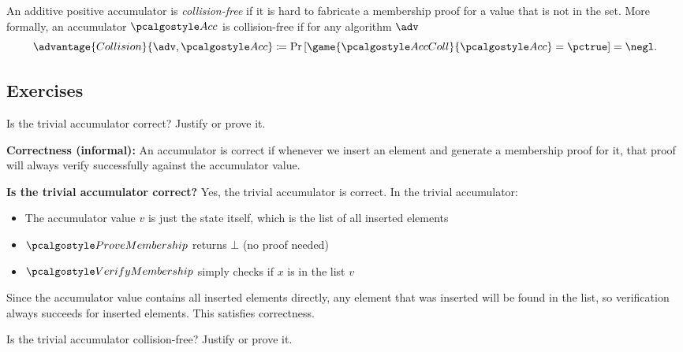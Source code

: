 \begin{definition}
    An additive positive accumulator is \emph{collision-free} if it is hard to fabricate a membership proof for a value that is not in the set.
    More formally, an accumulator $\algo{Acc}$ is collision-free if for any \ppt algorithm $\adv$
    \[
      \advantage{Collision}{\adv, \algo{Acc}} \defeq \pr{\game{\algo{AccColl}}{\algo{Acc}} = \pctrue} = \negl.
    \]
\end{definition}

\subsection{Exercises}

\begin{exercise}
  Is the trivial accumulator correct?
  Justify or prove it.
\end{exercise}

\ifsolutions
\begin{mysolution}
  \textbf{Correctness (informal):} An accumulator is correct if whenever we insert an element and generate a membership proof for it, that proof will always verify successfully against the accumulator value.
  
  \textbf{Is the trivial accumulator correct?} Yes, the trivial accumulator is correct.
  In the trivial accumulator:
  \begin{itemize}
    \item The accumulator value $v$ is just the state itself, which is the list of all inserted elements
    \item $\algo{ProveMembership}$ returns $\bot$ (no proof needed)
    \item $\algo{VerifyMembership}$ simply checks if $x$ is in the list $v$
  \end{itemize}
  
  Since the accumulator value contains all inserted elements directly, any element that was inserted will be found in the list, so verification always succeeds for inserted elements.
  This satisfies correctness.
\end{mysolution}
\fi

\begin{exercise}
  Is the trivial accumulator collision-free?
  Justify or prove it.
\end{exercise}

